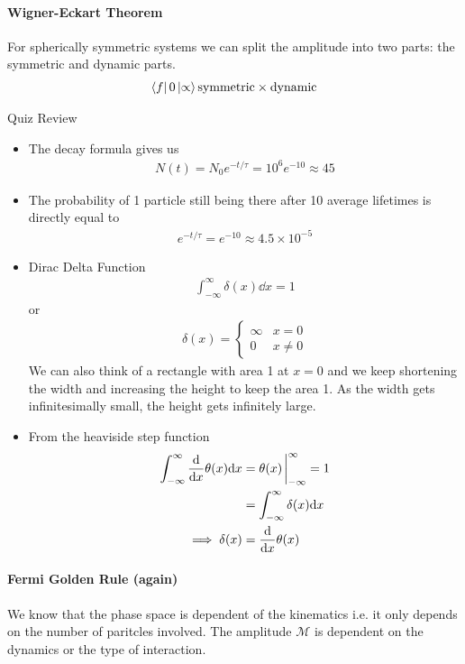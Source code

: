 \documentclass[../main.tex]{subfiles}
\begin{document}
\paragraph*{Wigner-Eckart Theorem} For spherically symmetric systems we can split the amplitude into
two parts: the symmetric and dynamic parts.
\begin{align*}
    \bra f 0 \ket \propto \text{symmetric} \times \text{dynamic}
\end{align*}

\newpage
{}
Quiz Review
\begin{itemize}
    \item The decay formula gives us 
    \begin{align*}
        N(t) = N_0 e^{-t/\tau} = 10^6 e^{-10} \approx 45
    \end{align*}
    \item The probability of 1 particle still being there after 10 average lifetimes is directly 
    equal to
    \begin{align*}
        e^{-t/\tau} = e^{-10} \approx 4.5 \times 10^{-5}
    \end{align*}
    \item Dirac Delta Function
    \begin{align*}
        \int_{-\infty}^\infty \delta(x) \dd x = 1
    \end{align*}
    or
    \begin{align*}
        \delta (x) = \begin{cases}
            \infty & x = 0 \\
            0 & x \neq 0
        \end{cases}
    \end{align*}
    We can also think of a rectangle with area 1 at $x = 0$ and we keep shortening the width and
    increasing the height to keep the area 1. As the width gets infinitesimally small, the height
    gets infinitely large. 
    \item From the heaviside step function
    \begin{align*}
        \int_{-\infty}^\infty \dv{x} \theta(x) \dd x &= \theta(x) \eval_{-\infty}^\infty = 1 \\
        &= \int_{-\infty}^\infty \delta(x) \dd x \\
        \implies \delta(x) &= \dv{x} \theta(x)
    \end{align*}
\end{itemize}
\paragraph*{Fermi Golden Rule (again)} We know that the phase space is dependent of the kinematics
i.e. it only depends on the number of paritcles involved. The amplitude $\mathcal{M}$ is dependent
on the dynamics or the type of interaction. 
\end{document}
